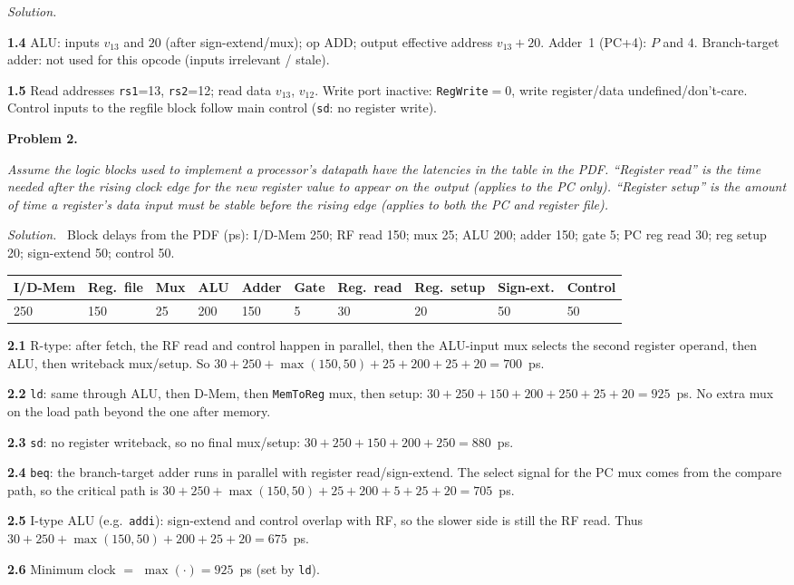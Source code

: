 \documentclass[12pt]{article}
\newcommand{\problem}[1]{\vspace{0.8em}\noindent\textbf{Problem #1.}\vspace{0.35em}}
\newenvironment{solution}{\par\noindent\textit{Solution.}\ }{\par\vspace{1.1em}}
\newcommand{\subproblem}[1]{\par\vspace{0.45em}\noindent\textbf{#1}\quad}
\newcommand{\assigntext}[1]{\par\vspace{0.25em}\small\textit{#1}\par\vspace{0.35em}}
\begin{document}
\begin{solution}
\subproblem{1.4}
ALU: inputs $v_{13}$ and $20$ (after sign-extend/mux); op ADD; output effective address $v_{13}+20$. Adder~1 (PC+4): $P$ and $4$. Branch-target adder: not used for this opcode (inputs irrelevant / stale).

\subproblem{1.5}
Read addresses \texttt{rs1}=13, \texttt{rs2}=12; read data $v_{13}$, $v_{12}$. Write port inactive: \texttt{RegWrite}$=$0, write register/data undefined/don't-care. Control inputs to the regfile block follow main control (\texttt{sd}: no register write).
\end{solution}

\problem{2}
\assigntext{Assume the logic blocks used to implement a processor's datapath have the latencies in the table in the PDF. ``Register read'' is the time needed after the rising clock edge for the new register value to appear on the output (applies to the PC only). ``Register setup'' is the amount of time a register's data input must be stable before the rising edge (applies to both the PC and register file).}

\begin{solution}
Block delays from the PDF (ps): I/D-Mem 250; RF read 150; mux 25; ALU 200; adder 150; gate 5; PC reg read 30; reg setup 20; sign-extend 50; control 50.

\begin{center}
\begin{tabular}{@{}llllllllll@{}}
\toprule
I/D-Mem & Reg.\ file & Mux & ALU & Adder & Gate & Reg.\ read & Reg.\ setup & Sign-ext. & Control \\
\midrule
250 & 150 & 25 & 200 & 150 & 5 & 30 & 20 & 50 & 50 \\
\bottomrule
\end{tabular}
\end{center}

\subproblem{2.1}
R-type: after fetch, the RF read and control happen in parallel, then the ALU-input mux selects the second register operand, then ALU, then writeback mux/setup. So
$30+250+\max(150,50)+25+200+25+20=700$~ps.

\subproblem{2.2}
\texttt{ld}: same through ALU, then D-Mem, then \texttt{MemToReg} mux, then setup: $30+250+150+200+250+25+20 = 925$~ps. No extra mux on the load path beyond the one after memory.

\subproblem{2.3}
\texttt{sd}: no register writeback, so no final mux/setup: $30+250+150+200+250 = 880$~ps.

\subproblem{2.4}
\texttt{beq}: the branch-target adder runs in parallel with register read/sign-extend. The select signal for the PC mux comes from the compare path, so the critical path is
$30+250+\max(150,50)+25+200+5+25+20=705$~ps.

\subproblem{2.5}
I-type ALU (e.g.\ \texttt{addi}): sign-extend and control overlap with RF, so the slower side is still the RF read. Thus
$30+250+\max(150,50)+200+25+20=675$~ps.

\subproblem{2.6}
Minimum clock $=$ $\max(\cdot)=925$~ps (set by \texttt{ld}).
\end{solution}
\end{document}
